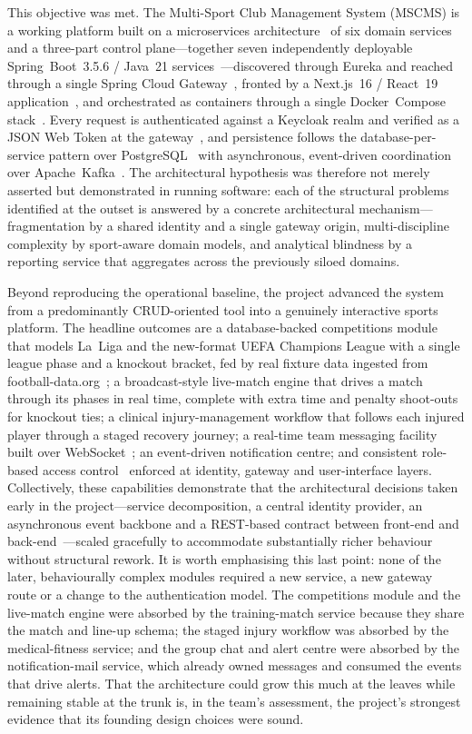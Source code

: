 This objective was met. The Multi-Sport Club Management System (MSCMS) is a working
platform built on a microservices architecture~\cite{microservices} of six domain
services and a three-part control plane---together seven independently deployable
Spring~Boot~3.5.6 / Java~21 services~\cite{springboot}---discovered through Eureka and
reached through a single Spring Cloud Gateway~\cite{springcloud}, fronted by a
Next.js~16 / React~19 application~\cite{nextjs,react}, and orchestrated as containers
through a single Docker~Compose stack~\cite{docker}. Every request is authenticated against
a Keycloak realm and verified as a JSON Web Token at the gateway~\cite{keycloak,jwt}, and
persistence follows the database-per-service pattern over PostgreSQL~\cite{postgres} with
asynchronous, event-driven coordination over Apache~Kafka~\cite{kafka}. The architectural
hypothesis was therefore not merely asserted but demonstrated in running software: each of
the structural problems identified at the outset is answered by a concrete architectural
mechanism---fragmentation by a shared identity and a single gateway origin, multi-discipline
complexity by sport-aware domain models, and analytical blindness by a reporting service
that aggregates across the previously siloed domains.

Beyond reproducing the operational baseline, the project advanced the system from a
predominantly CRUD-oriented tool into a genuinely interactive sports platform. The
headline outcomes are a database-backed competitions module that models La~Liga and the
new-format UEFA Champions League with a single league phase and a knockout bracket, fed by
real fixture data ingested from football-data.org~\cite{footballdata}; a broadcast-style
live-match engine that drives a match through its phases in real time, complete with
extra time and penalty shoot-outs for knockout ties; a clinical injury-management
workflow that follows each injured player through a staged recovery journey; a real-time
team messaging facility built over WebSocket~\cite{websocket}; an event-driven
notification centre; and consistent role-based access control~\cite{rbac} enforced at
identity, gateway and user-interface layers. Collectively, these capabilities
demonstrate that the architectural decisions taken early in the project---service
decomposition, a central identity provider, an asynchronous event backbone and a
REST-based contract between front-end and back-end~\cite{restapi}---scaled gracefully to
accommodate substantially richer behaviour without structural rework. It is worth
emphasising this last point: none of the later, behaviourally complex modules required a
new service, a new gateway route or a change to the authentication model. The competitions
module and the live-match engine were absorbed by the training-match service because they
share the match and line-up schema; the staged injury workflow was absorbed by the
medical-fitness service; and the group chat and alert centre were absorbed by the
notification-mail service, which already owned messages and consumed the events that drive
alerts. That the architecture could grow this much at the leaves while remaining stable at
the trunk is, in the team's assessment, the project's strongest evidence that its founding
design choices were sound.

